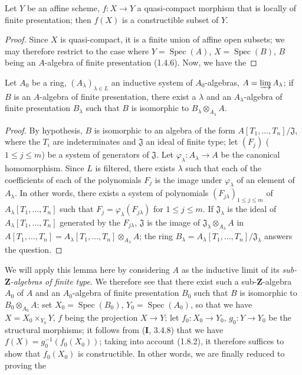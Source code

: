 \begin{lemma}[1.8.4.1]
\label{IV.1.8.4.1}
Let $Y$ be an affine scheme, $f:X\to Y$ a quasi-compact morphism that is
locally of finite presentation; then $f(X)$ is a constructible subset
of $Y$.
\end{lemma}

\begin{proof}
Since $X$ is quasi-compact, it is a finite union of affine open subsets; we
may therefore restrict to the case where $Y=\operatorname{Spec}(A)$,
$X=\operatorname{Spec}(B)$, $B$ being an $A$-algebra of finite presentation
(1.4.6). Now, we have the
\end{proof}

\begin{lemma}[1.8.4.2]
\label{IV.1.8.4.2}
Let $A_0$ be a ring, $(A_\lambda)_{\lambda\in L}$ an inductive system of
$A_0$-algebras, $A=\varinjlim A_\lambda$; if $B$ is an $A$-algebra of finite
presentation, there exist a $\lambda$ and an $A_\lambda$-algebra of finite
presentation $B_\lambda$ such that $B$ is isomorphic to
$B_\lambda\otimes_{A_\lambda}A$.
\end{lemma}

\begin{proof}
By hypothesis, $B$ is isomorphic to an algebra of the form
$A[T_1,\ldots,T_n]/\mathfrak J$, where the $T_i$ are indeterminates and
$\mathfrak J$ an ideal of finite type; let $(F_j)$ ($1\leq j\leq m$) be a
system of generators of $\mathfrak J$. Let
$\varphi_\lambda:A_\lambda\to A$ be the canonical homomorphism. Since $L$ is
filtered, there exists $\lambda$ such that each of the coefficients of each of
the polynomials $F_j$ is the image under $\varphi_\lambda$ of an element of
$A_\lambda$. In other words, there exists a system of polynomials
$(F_{j\lambda})_{1\leq j\leq m}$ of $A_\lambda[T_1,\ldots,T_n]$ such that
$F_j=\varphi_\lambda(F_{j\lambda})$ for $1\leq j\leq m$. If
$\mathfrak J_\lambda$ is the ideal of $A_\lambda[T_1,\ldots,T_n]$ generated
by the $F_{j\lambda}$, $\mathfrak J$ is the image of
$\mathfrak J_\lambda\otimes_{A_\lambda}A$ in
$A[T_1,\ldots,T_n]=A_\lambda[T_1,\ldots,T_n]\otimes_{A_\lambda}A$;
the ring $B_\lambda=A_\lambda[T_1,\ldots,T_n]/\mathfrak J_\lambda$ answers
the question.
\end{proof}

We will apply this lemma here by considering $A$ as the inductive limit of its
\emph{sub-$\mathbf Z$-algebras of finite type}. We therefore see that there
exist such a sub-$\mathbf Z$-algebra $A_0$ of $A$ and an $A_0$-algebra of
finite presentation $B_0$ such that $B$ is isomorphic to
$B_0\otimes_{A_0}A$; set $X_0=\operatorname{Spec}(B_0)$,
$Y_0=\operatorname{Spec}(A_0)$, so that we have $X=X_0\times_{Y_0}Y$,
$f$ being the projection $X\to Y$; let $f_0:X_0\to Y_0$,
$g_0:Y\to Y_0$ be the structural morphisms; it follows from (\textbf{I}, 3.4.8) that
we have $f(X)=g_0^{-1}(f_0(X_0))$; taking into account (1.8.2), it therefore
suffices to show that $f_0(X_0)$ is constructible. In other words, we are
finally reduced to proving the

